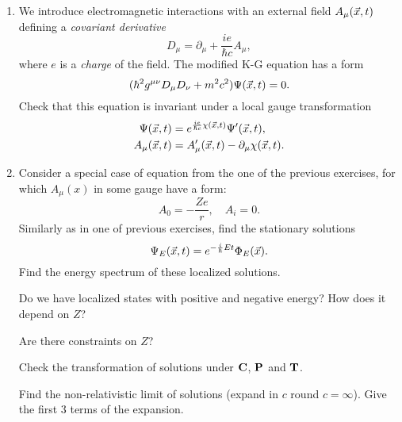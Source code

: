 \documentclass[a4paper,11pt]{article}
\begin{document}
\begin{enumerate}
\item We introduce electromagnetic interactions with an external field
  $A_{ \mu }( \vec{ x }, t )$ defining a \textit{covariant derivative}
  \begin{equation}
    \label{eq:15}
    D_{ \mu } = \partial_{ \mu } + \frac{ i e }{ \hbar c } A_{ \mu },
  \end{equation}
  where $e$ is a \textit{charge} of the field. The modified K-G
  equation has a form
  \begin{equation}
    \label{eq:16}
    ( \hbar^{ 2 } g^{ \mu \nu } D_{ \mu } D_{ \nu } + m^{ 2 } c^{ 2 } ) \Psi( \vec{ x }, t )
    = 0.
  \end{equation}
  Check that this equation is invariant under a local gauge
  transformation
  \begin{align}
    \Psi( \vec{ x }, t )
    &= e^{ \frac{ i e }{ \hbar c } \chi( \vec{ x }, t ) } \Psi'( \vec{ x }, t ), \\
    A_{ \mu }( \vec{ x }, t )
    &= A_{ \mu }'( \vec{ x }, t ) - \partial_{ \mu } \chi( \vec{ x }, t ).
  \end{align}

\item Consider a special case of equation from the one of the previous
  exercises, for which $A_{ \mu }( x )$ in some gauge have a form:
  \begin{equation}
    \label{eq:17}
    A_{ 0 } = -\frac{ Z e }{ r }, \quad
    A_{ i } = 0.
  \end{equation}
  Similarly as in one of previous exercises, find the stationary
  solutions
  \begin{equation}
    \label{eq:18}
    \Psi_{ E }( \vec{ x }, t ) = e^{ -\frac{ i }{ \hbar } E t } \Phi_{ E }( \vec{ x } ).
  \end{equation}
  Find the energy spectrum of these localized solutions.

  Do we have localized states with positive and negative energy? How
  does it depend on $Z$?

  Are there constraints on $Z$?

  Check the transformation of solutions under $\mathbf{C}$, $\mathbf{P}$ and
  $\mathbf{T}$.

  Find the non-relativistic limit of solutions (expand in $c$ round
  $c = \infty$). Give the first 3 terms of the expansion.


\end{enumerate}
\end{document}
